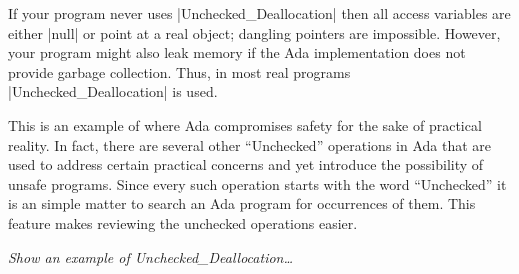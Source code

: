 If your program never uses |Unchecked_Deallocation| then all access variables are either |null|
or point at a real object; dangling pointers are impossible. However, your program might also
leak memory if the Ada implementation does not provide garbage collection. Thus, in most real
programs |Unchecked_Deallocation| is used.

This is an example of where Ada compromises safety for the sake of practical reality. In fact,
there are several other ``Unchecked'' operations in Ada that are used to address certain
practical concerns and yet introduce the possibility of unsafe programs. Since every such
operation starts with the word ``Unchecked'' it is an simple matter to search an Ada program for
occurrences of them. This feature makes reviewing the unchecked operations easier.

\textit{Show an example of Unchecked\_Deallocation\ldots}

